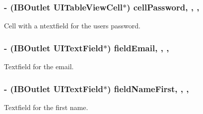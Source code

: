 \subsubsection[{cell\+Password}]{\setlength{\rightskip}{0pt plus 5cm}-\/ (I\+B\+Outlet U\+I\+Table\+View\+Cell$\ast$) cell\+Password\hspace{0.3cm}{\ttfamily [read]}, {\ttfamily [write]}, {\ttfamily [nonatomic]}, {\ttfamily [strong]}}\label{interface_e_s_sign_up_view_controller_a55e541f4d1da8d33c9baf5bfc5925583}
Cell with a ntextfield for the user\textquotesingle{}s password. \hypertarget{interface_e_s_sign_up_view_controller_a37efd61b8578141a576c47832506f0fa}{}
\subsubsection[{field\+Email}]{\setlength{\rightskip}{0pt plus 5cm}-\/ (I\+B\+Outlet U\+I\+Text\+Field$\ast$) field\+Email\hspace{0.3cm}{\ttfamily [read]}, {\ttfamily [write]}, {\ttfamily [nonatomic]}, {\ttfamily [strong]}}\label{interface_e_s_sign_up_view_controller_a37efd61b8578141a576c47832506f0fa}
Textfield for the email. \hypertarget{interface_e_s_sign_up_view_controller_a682f54929d184f7f5ad8836976caa4f8}{}
\subsubsection[{field\+Name\+First}]{\setlength{\rightskip}{0pt plus 5cm}-\/ (I\+B\+Outlet U\+I\+Text\+Field$\ast$) field\+Name\+First\hspace{0.3cm}{\ttfamily [read]}, {\ttfamily [write]}, {\ttfamily [nonatomic]}, {\ttfamily [strong]}}\label{interface_e_s_sign_up_view_controller_a682f54929d184f7f5ad8836976caa4f8}
Textfield for the first name. \hypertarget{interface_e_s_sign_up_view_controller_ab18ed392ce76c100d25681bc39d7375c}{}
